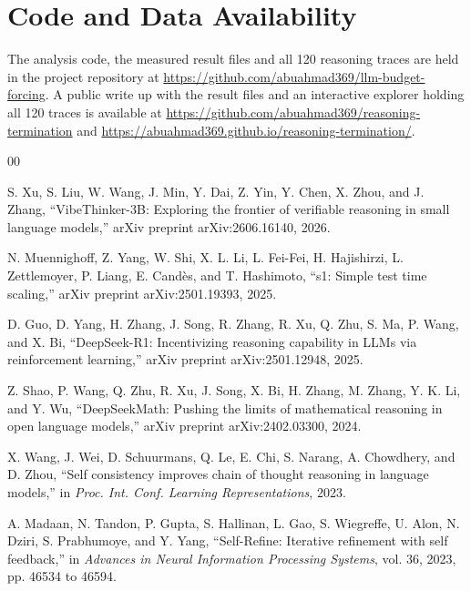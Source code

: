 \documentclass[conference]{IEEEtran}
\begin{document}
\section*{Code and Data Availability}

The analysis code, the measured result files and all 120 reasoning traces are held
in the project repository at
\url{https://github.com/abuahmad369/llm-budget-forcing}.
A public write up with the result files and an interactive explorer holding all
120 traces is available at
\url{https://github.com/abuahmad369/reasoning-termination}
and \url{https://abuahmad369.github.io/reasoning-termination/}.

\begin{thebibliography}{00}

S. Xu, S. Liu, W. Wang, J. Min, Y. Dai, Z. Yin, Y. Chen, X. Zhou, and J. Zhang,
``VibeThinker-3B: Exploring the frontier of verifiable reasoning in small language
models,'' arXiv preprint arXiv:2606.16140, 2026.

N. Muennighoff, Z. Yang, W. Shi, X. L. Li, L. Fei-Fei, H. Hajishirzi,
L. Zettlemoyer, P. Liang, E. Cand\`{e}s, and T. Hashimoto, ``s1: Simple test time
scaling,'' arXiv preprint arXiv:2501.19393, 2025.

D. Guo, D. Yang, H. Zhang, J. Song, R. Zhang, R. Xu, Q. Zhu, S. Ma, P. Wang, and
X. Bi, ``DeepSeek-R1: Incentivizing reasoning capability in LLMs via reinforcement
learning,'' arXiv preprint arXiv:2501.12948, 2025.

Z. Shao, P. Wang, Q. Zhu, R. Xu, J. Song, X. Bi, H. Zhang, M. Zhang, Y. K. Li, and
Y. Wu, ``DeepSeekMath: Pushing the limits of mathematical reasoning in open
language models,'' arXiv preprint arXiv:2402.03300, 2024.

X. Wang, J. Wei, D. Schuurmans, Q. Le, E. Chi, S. Narang, A. Chowdhery, and
D. Zhou, ``Self consistency improves chain of thought reasoning in language
models,'' in \emph{Proc. Int. Conf. Learning Representations}, 2023.

A. Madaan, N. Tandon, P. Gupta, S. Hallinan, L. Gao, S. Wiegreffe, U. Alon,
N. Dziri, S. Prabhumoye, and Y. Yang, ``Self-Refine: Iterative refinement with self
feedback,'' in \emph{Advances in Neural Information Processing Systems}, vol. 36,
2023, pp. 46534 to 46594.


\end{thebibliography}
\end{document}
